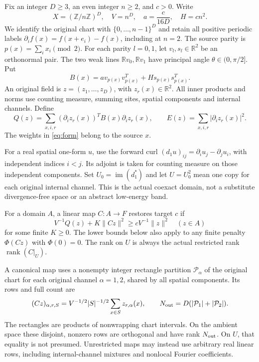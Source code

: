 \documentclass[11pt,a4paper]{article}
\newcommand{\R}{\mathbb R}
\newcommand{\Z}{\mathbb Z}
\newcommand{\im}{\operatorname{im}}
\newcommand{\rank}{\operatorname{rank}}
\newcommand{\norm}[1]{\lVert#1\rVert}
\begin{document}
Fix an integer $D\geq3$, an even integer $n\geq2$, and $c>0$. Write
\[
 X=(\Z/n\Z)^D,\quad V=n^D,\quad
 a=\frac{c}{16D},\quad H=cn^2.
\]
We identify the original chart with $\{0,\ldots,n-1\}^D$ and retain all
positive periodic labels $\partial_i f(x)=f(x+e_i)-f(x)$, including at $n=2$.
The source parity is $p(x)=\sum_i x_i\pmod2$. For each parity $l=0,1$,
let $v_l,s_l\in\R^2$ be an orthonormal pair. The two weak lines
$\R v_0,\R v_1$ have principal angle $\theta\in(0,\pi/2]$. Put
\[
 B(x)=a v_{p(x)}v_{p(x)}^T+H s_{p(x)}s_{p(x)}^T.
\]
An original field is $z=(z_1,\ldots,z_D)$, with $z_r(x)\in\R^2$.
All inner products and norms use counting measure, summing sites, spatial
components and internal channels. Define
\begin{equation}\label{eq:form}
 Q(z)=\sum_{x,i,r}(\partial_i z_r(x))^T B(x)\partial_i z_r(x),
 \qquad E(z)=\sum_{x,i,r}|\partial_i z_r(x)|^2.
\end{equation}
The weights in \eqref{eq:form} belong to the source $x$.

For a real spatial one-form $u$, use the forward curl
$(d_1u)_{ij}=\partial_i u_j-\partial_j u_i$, with independent indices $i<j$.
Its adjoint is taken for counting measure on those independent components.
Set $U_0=\im(d_1^*)$ and let $U=U_0^2$ mean one copy for each original
internal channel. This is the actual coexact domain, not a substitute
divergence-free space or an abstract low-energy band.

For a domain $A$, a linear map $C:A\to F$ restores target $c$ if
\begin{equation}\label{eq:restore}
 V^{-1}Q(z)+K\norm{Cz}^2\geq cV^{-1}\norm{z}^2\quad(z\in A)
\end{equation}
for some finite $K\geq0$. The lower bounds below also apply to any finite
penalty $\Phi(Cz)$ with $\Phi(0)=0$. The rank on $U$ is always the actual
restricted rank $\rank(C|_U)$.

A canonical map uses a nonempty integer rectangle partition $\mathcal P_\alpha$
of the original chart for each original channel $\alpha=1,2$, shared by all
spatial components. Its rows and full count are
\begin{equation}\label{eq:canonical}
 (Cz)_{\alpha,r,S}=V^{-1/2}|S|^{-1/2}\sum_{x\in S}z_{r,\alpha}(x),
 \qquad N_{\rm out}=D(|\mathcal P_1|+|\mathcal P_2|).
\end{equation}
The rectangles are products of nonwrapping chart intervals. On the ambient
space these disjoint, nonzero rows are orthogonal and have rank $N_{\rm out}$.
On $U$, that equality is not presumed. Unrestricted maps may instead use
arbitrary real linear rows, including internal-channel mixtures and nonlocal
Fourier coefficients.
\end{document}
